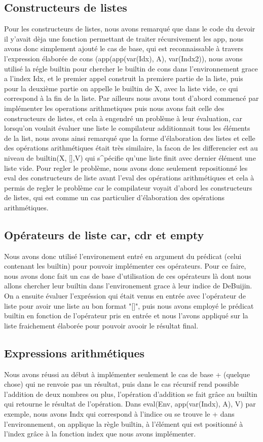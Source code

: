 \documentclass{article}
\begin{document}
\subsection{Constructeurs de listes}
Pour les constructeurs de listes, nous avons remarqué que dans le code du devoir il y'avait dèja une fonction permettant de traiter récursivement les app, nous avons donc simplement ajouté le cas de base, qui est reconnaissable à travers l'expression élaborée de cons (app(app(var(Idx), A), var(Indx2)), nous avons utilisé la régle builtin pour chercher le builtin de cons dans l'environnement grace a l'index Idx,  et le premier appel construit la premiere partie de la liste, puis pour la deuxième partie on appelle le builtin de X, avec la liste vide, ce qui correspond à la fin de la liste. Par ailleurs nous avons tout d'abord commencé par implémenter les operations arithmetiques
    puis nous avons fait celle des constructeurs de listes, et cela à engendré un problème à leur évaluation, car lorsqu'on voulait évaluer une liste
    le compilateur additionnait tous les éléments de la list, nous avons ainsi remarqué que la forme d'élaboration des listes et celle des opérations arithmétiques était très similaire, la facon de les differencier est au niveau de builtin(X, [],V) qui s^pécifie qu'une liste finit avec dernier élément une liste vide. Pour regler le problème, nous avons donc seulement repositionné les eval des constructeurs de liste avant l'eval des opérations arithmétiques et cela à permis de regler le problème car le compilateur voyait d'abord les constructeurs de listes, qui est comme un cas particulier d'élaboration des opérations arithmétiques.

 \subsection{Opérateurs de liste car, cdr et empty}
 Nous avons donc utilisé l'environement entré en argument du prédicat (celui contenant les builtin) pour pouvoir implémenter ces opérateurs. Pour ce faire, nous avons donc fait un cas de base d'utilisation de ces opérateurs là dont nous allons chercher leur builtin dans l'environement grace à leur indice de DeBuijin. On a ensuite évaluer l'expréssion qui était venus en entrée avec l'opérateur  de liste pour avoir une liste au bon format "[]", puis nous avons employé le prédicat builtin en fonction de l'opérateur pris en entrée et nous l'avons appliqué sur la liste fraichement élaborée pour pouvoir avooir le résultat final.
 
 \subsection{Expressions arithmétiques}
 Nous avons réussi au début à implémenter seulement le cas de base + (quelque chose) qui ne renvoie pas un résultat, puis dans le cas récursif rend possible l'addition de deux nombres ou plus, l'opération d'addition se fait grâce au builtin qui retourne le résultat de l'opération. Dans 
 eval(Env, app(var(Indx), A), V) par exemple, nous avons  Indx qui correspond à l'indice ou se trouve le + dans l'environnement, on applique la règle builtin, à l'élément qui est positionné à l'index grâce à la fonction index que nous avons implémenter.
 
\end{document}
